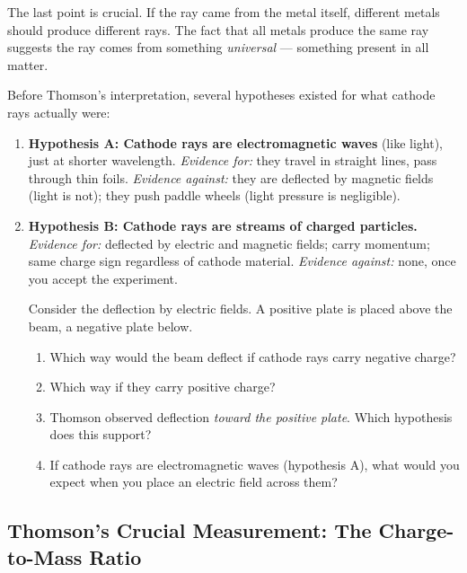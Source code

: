 \documentclass[12pt, a4paper]{book}
\theoremstyle{definition}
\begin{document}
The last point is crucial.
If the ray came from the metal itself, different metals
should produce different rays.
The fact that all metals produce the same ray suggests
the ray comes from something \emph{universal} ---
something present in all matter.

\begin{puzzlebox}
Before Thomson's interpretation, several hypotheses existed
for what cathode rays actually were:

\begin{enumerate}[label=(\alph*), leftmargin=*]
  \item \textbf{Hypothesis A: Cathode rays are electromagnetic waves}
        (like light), just at shorter wavelength.
        \textit{Evidence for:} they travel in straight lines,
        pass through thin foils.
        \textit{Evidence against:} they are deflected by magnetic
        fields (light is not); they push paddle wheels (light
        pressure is negligible).

  \item \textbf{Hypothesis B: Cathode rays are streams of charged particles.}
        \textit{Evidence for:} deflected by electric and magnetic fields;
        carry momentum; same charge sign regardless of cathode material.
        \textit{Evidence against:} none, once you accept the experiment.

  Consider the deflection by electric fields.
  A positive plate is placed above the beam, a negative plate below.

  \begin{enumerate}[label=(\roman*)]
    \item Which way would the beam deflect if cathode rays
          carry negative charge?
    \item Which way if they carry positive charge?
    \item Thomson observed deflection \emph{toward the positive plate}.
          Which hypothesis does this support?
    \item If cathode rays are electromagnetic waves (hypothesis A),
          what would you expect when you place an electric field
          across them?
  \end{enumerate}
\end{enumerate}
\end{puzzlebox}

\subsection{Thomson's Crucial Measurement: The Charge-to-Mass Ratio}
\end{document}
